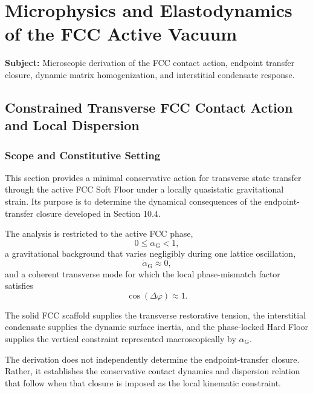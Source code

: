 \chapter{Microphysics and Elastodynamics of the FCC Active Vacuum}
\label{app:fcc_microphysics}

\noindent\textbf{Subject:} Microscopic derivation of the FCC contact action, endpoint transfer closure, dynamic matrix homogenization, and interstitial condensate response.

\section{Constrained Transverse FCC Contact Action and Local Dispersion}

\subsection{Scope and Constitutive Setting}

This section provides a minimal conservative action for transverse state transfer through the active FCC Soft Floor under a locally quasistatic gravitational strain. Its purpose is to determine the dynamical consequences of the endpoint-transfer closure developed in Section 10.4.

The analysis is restricted to the active FCC phase,
\begin{equation}
    0 \leq \alpha_{\mathrm{G}} < 1,
\end{equation}
a gravitational background that varies negligibly during one lattice oscillation,
\begin{equation}
    \dot{\alpha}_{\mathrm{G}} \approx 0,
\end{equation}
and a coherent transverse mode for which the local phase-mismatch factor satisfies
\begin{equation}
    \cos(\Delta\varphi) \approx 1.
\end{equation}

The solid FCC scaffold supplies the transverse restorative tension, the interstitial condensate supplies the dynamic surface inertia, and the phase-locked Hard Floor supplies the vertical constraint represented macroscopically by $\alpha_{\mathrm{G}}$.

The derivation does not independently determine the endpoint-transfer closure. Rather, it establishes the conservative contact dynamics and dispersion relation that follow when that closure is imposed as the local kinematic constraint.

